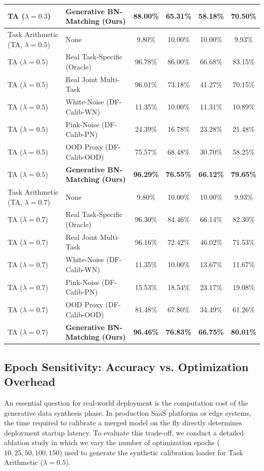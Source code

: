 \documentclass{article}
\theoremstyle{plain}
\theoremstyle{definition}
\theoremstyle{remark}
\begin{document}
\begin{table}[t]
\begin{center}
\begin{small}
\begin{tabular}{llcccc}
TA ($\lambda=0.3$) & \textbf{Generative BN-Matching (Ours)} & \textbf{88.00\%} & \textbf{65.31\%} & \textbf{58.18\%} & \textbf{70.50\%} \\
\midrule
Task Arithmetic (TA, $\lambda=0.5$) & None & 9.80\% & 10.00\% & 10.00\% & 9.93\% \\
TA ($\lambda=0.5$) & Real Task-Specific (Oracle) & 96.78\% & 86.00\% & 66.68\% & 83.15\% \\
TA ($\lambda=0.5$) & Real Joint Multi-Task & 96.01\% & 73.18\% & 41.27\% & 70.15\% \\
TA ($\lambda=0.5$) & White-Noise (DF-Calib-WN) & 11.35\% & 10.00\% & 11.31\% & 10.89\% \\
TA ($\lambda=0.5$) & Pink-Noise (DF-Calib-PN) & 24.39\% & 16.78\% & 23.28\% & 21.48\% \\
TA ($\lambda=0.5$) & OOD Proxy (DF-Calib-OOD) & 75.57\% & 68.48\% & 30.70\% & 58.25\% \\
TA ($\lambda=0.5$) & \textbf{Generative BN-Matching (Ours)} & \textbf{96.29\%} & \textbf{76.55\%} & \textbf{66.12\%} & \textbf{79.65\%} \\
\midrule
Task Arithmetic (TA, $\lambda=0.7$) & None & 9.80\% & 10.00\% & 10.00\% & 9.93\% \\
TA ($\lambda=0.7$) & Real Task-Specific (Oracle) & 96.30\% & 84.46\% & 66.14\% & 82.30\% \\
TA ($\lambda=0.7$) & Real Joint Multi-Task & 96.16\% & 72.42\% & 46.02\% & 71.53\% \\
TA ($\lambda=0.7$) & White-Noise (DF-Calib-WN) & 11.35\% & 10.00\% & 13.67\% & 11.67\% \\
TA ($\lambda=0.7$) & Pink-Noise (DF-Calib-PN) & 15.53\% & 18.54\% & 23.17\% & 19.08\% \\
TA ($\lambda=0.7$) & OOD Proxy (DF-Calib-OOD) & 81.48\% & 67.80\% & 34.49\% & 61.26\% \\
TA ($\lambda=0.7$) & \textbf{Generative BN-Matching (Ours)} & \textbf{96.46\%} & \textbf{76.83\%} & \textbf{66.75\%} & \textbf{80.01\%} \\
\bottomrule
\end{tabular}
\end{small}
\end{center}
\vskip -0.1in
\end{table}

\subsection{Epoch Sensitivity: Accuracy vs. Optimization Overhead}
An essential question for real-world deployment is the computation cost of the generative data synthesis phase. In production SaaS platforms or edge systems, the time required to calibrate a merged model on the fly directly determines deployment startup latency. To evaluate this trade-off, we conduct a detailed ablation study in which we vary the number of optimization epochs ($10, 25, 50, 100, 150$) used to generate the synthetic calibration loader for Task Arithmetic ($\lambda=0.5$). 
\end{document}
